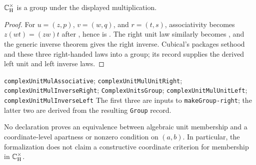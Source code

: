 \begin{proposition}
$\mathbb{C}_{\mathrm H}^{\times}$ is a group under the displayed multiplication.
\end{proposition}
\begin{proof}
For $u=(z,p)$, $v=(w,q)$, and $r=(t,s)$, associativity becomes
$z(wt)=(zw)t$ after , hence is
.  The right unit law similarly becomes
, and the generic inverse theorem gives the right
inverse.  Cubical's  packages sethood and these three
right-handed laws into a group; its record supplies the derived left unit and
left inverse laws.
\end{proof}
{\texttt{complexUnitMulAssociative}; \texttt{complexUnitMulUnitRight}; \texttt{complexUnitMulInverseRight}; \texttt{ComplexUnitsGroup}; \texttt{complexUnitMulUnitLeft}; \texttt{complexUnitMulInverseLeft}}
{The first three are inputs to \texttt{makeGroup-right}; the latter two are derived from the resulting \texttt{Group} record.}

\begin{warning}
No declaration proves an equivalence between algebraic unit membership and a
coordinate-level apartness or nonzero condition on $(a,b)$.  In particular,
the formalization does not claim a constructive coordinate criterion for
membership in $\mathbb{C}_{\mathrm H}^{\times}$.
\end{warning}
